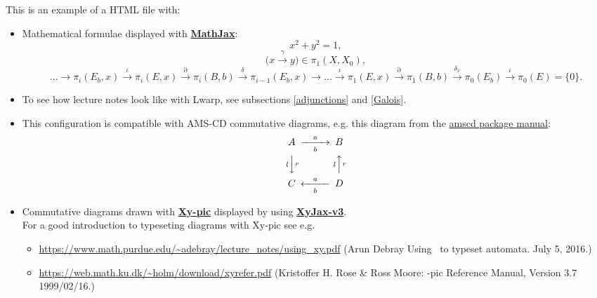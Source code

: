 \documentclass[a4paper,12pt]{article}
\newtheorem{Fundamental Theorem}{Fundamental Theorem}
\newcommand{\ra}[1]{\xrightarrow{#1}}
\newcommand{\Q}{\mathbb{Q}}
\renewcommand{\a}{{\alpha}}
\def \w {\omega}
\def \e {\epsilon}
\def \z {\zeta}
\def \d {\partial}
\begin{document}
This is an example of a HTML file with:
\begin{itemize}
\item Mathematical formulae displayed with  \href{https://www.mathjax.org/}{\textbf{MathJax}}:
\begin{equation}\label{test}
   x^2+y^2=1,
\end{equation}
$$\big ( x \ra{ \gamma } y\big) \in \pi_1(X,X_0),
$$
$$
\dots \to \pi_i(E_b,x) \ra{\iota} \pi_i(E,x) \ra{\d}  \pi_i(B,b) \ra{\delta}  \pi_{i-1}(E_b,x) \to \dots
 \ra{\iota} \pi_1(E,x) \ra{\partial}  \pi_1(B,b) \ra{\delta_x} \pi_0(E_b) \ra{\iota} \pi_0(E)=\{0\}.
$$

\item To see how lecture notes look like with Lwarp, see subsections \ref{adjunctions} and \ref{Galois}.
\item 
This configuration is compatible with AMS-CD commutative diagrams, e.g. this diagram from the \href{https://www.jmilne.org/not/Mamscd.pdf}{amscd package manual}:
\[
\begin{CD}
A @>a>b> B\\
@VlVrV @AlArA\\
C @<a<b< D
\end{CD}
\]\begin{quotation}
  \end{quotation}

\item  Commutative diagrams drawn with \href{https://tug.org/applications/Xy-pic/}{\textbf{Xy-pic}} displayed by using \href{https://github.com/sonoisa/XyJax-v3}{\textbf{XyJax-v3}}.\\
For a good introduction to typeseting diagrams with Xy-pic see e.g.
\begin{itemize}
 \item \url{https://www.math.purdue.edu/~adebray/lecture_notes/using_xy.pdf} (Arun Debray
Using \Xy\ to typeset automata.
July 5, 2016.)


\item \url{https://web.math.ku.dk/~holm/download/xyrefer.pdf} (Kristoffer H. Rose \&
Ross Moore: \Xy-pic Reference Manual, Version 3.7 1999/02/16.)


\end{itemize}
\end{itemize}
\end{document}
